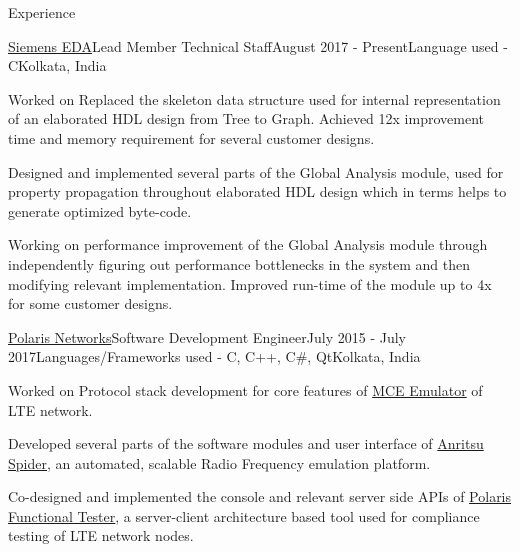 \documentclass{resume}
\begin{document}

\begin{rSection}{Experience}

\begin{rSubsection}{\href{https://mentor.com}{Siemens EDA}}{Lead Member Technical Staff}{August 2017 - Present}{Language used - C}{Kolkata, India}
\item Worked on Replaced the skeleton data structure used for internal representation of an elaborated HDL design from Tree to Graph. Achieved 12x improvement time and memory requirement for several customer designs.
\item Designed and implemented several parts of the Global Analysis module, used for property propagation throughout elaborated HDL design which in terms helps to generate optimized byte-code.
\item Working on performance improvement of the Global Analysis module through independently figuring out performance bottlenecks in the system and then modifying relevant implementation. Improved run-time of the module up to 4x for some customer designs.
\end{rSubsection}

\begin{rSubsection}{\href{http://www.polarisnetworks.net/}{Polaris Networks}}{Software Development Engineer}{July 2015 - July 2017}{Languages/Frameworks used - C, C++, C\#, Qt}{Kolkata, India}
\item Worked on Protocol stack development for core features of \href{https://polarisnetworks.net/lte_emulators.html}{MCE Emulator} of LTE network.
\item Developed several parts of the software modules and user interface of \href{https://www.anritsu.com/en-us/test-measurement/products/spider}{Anritsu Spider}, an automated, scalable Radio Frequency emulation platform.
\item Co-designed and implemented the console and relevant server side APIs of \href{https://polarisnetworks.net/functional-testers.html}{Polaris Functional Tester}, a server-client architecture based tool used for compliance testing of LTE network nodes.
\end{rSubsection}

\end{rSection}
\end{document}
